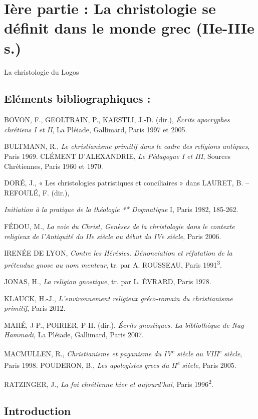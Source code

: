 

 
\chapter{Ière partie : La christologie se définit dans le monde grec
(IIe-IIIe s.)}

 
La christologie du Logos

\section{Eléments bibliographiques :}

BOVON, F., GEOLTRAIN, P., KAESTLI, J.-D. (dir.), \emph{Écrits apocryphes
chrétiens I et II}, La Pléiade, Gallimard, Paris 1997 et 2005.

BULTMANN, R., \emph{Le christianisme primitif dans le cadre des
religions antiques}, Paris 1969. CLÉMENT D'ALEXANDRIE, \emph{Le
Pédagogue I et III}, Sources Chrétiennes, Paris 1960 et 1970.

DORÉ, J., « Les christologies patristiques et conciliaires » dans
LAURET, B. -- REFOULÉ, F. (dir.),

\emph{Initiation à la pratique de la théologie ** Dogmatique} I, Paris
1982, 185-262.

FÉDOU, M., \emph{La voie du Christ, Genèses de la christologie dans le
contexte religieux de l'Antiquité du IIe siècle au début du IVe siècle},
Paris 2006.

IRENÉE DE LYON, \emph{Contre les Hérésies. Dénonciation et réfutation de
la prétendue gnose au nom menteur}, tr. par A. ROUSSEAU, Paris
1991\textsuperscript{3}.

JONAS, H., \emph{La religion gnostique}, tr. par L. ÉVRARD, Paris 1978.

KLAUCK, H.-J., \emph{L'environnement religieux gréco-romain du
christianisme primitif}, Paris 2012.

MAHÉ, J-P., POIRIER, P-H. (dir.), \emph{Écrits gnostiques. La
bibliothèque de Nag Hammadi}, La Pléiade, Gallimard, Paris 2007.

MACMULLEN, R., \emph{Christianisme et paganisme du IV\textsuperscript{e}
siècle au VIII\textsuperscript{e} siècle}, Paris 1998. POUDERON, B.,
\emph{Les apologistes grecs du II\textsuperscript{e} siècle}, Paris
2005.

RATZINGER, J., \emph{La foi chrétienne hier et aujourd'hui}, Paris
1996\textsuperscript{2}.
 
\hypertarget{introduction}{%
\section{Introduction}\label{introduction}}

